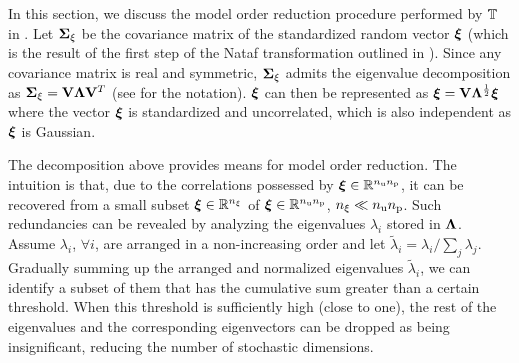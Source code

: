 In this section, we discuss the model order reduction procedure performed by $\transformation$ in .
Let $\bm{\Sigma}_\xi$ be the covariance matrix of the standardized random vector $\bm{\xi}$ (which is the result of the first step of the Nataf transformation outlined in ).
Since any covariance matrix is real and symmetric, $\bm{\Sigma}_\xi$ admits the eigenvalue decomposition as $\bm{\Sigma}_\xi = \mathbf{V} \mathbf{\Lambda} \mathbf{V}^T$ (see  for the notation).
$\bm{\xi}$ can then be represented as $\bm{\xi} = \mathbf{V} \mathbf{\Lambda}^\frac{1}{2} \bm{\xi}$ where the vector $\bm{\xi}$ is standardized and uncorrelated, which is also independent as $\bm{\xi}$ is Gaussian.

The decomposition above provides means for model order reduction.
The intuition is that, due to the correlations possessed by $\bm{\xi} \in \mathbb{R}^{{n_\text{u}} {n_\text{p}}}$, it can be recovered from a small subset $\bm{\xi} \in \mathbb{R}^{n_\xi}$ of $\bm{\xi}\in \mathbb{R}^{{n_\text{u}} {n_\text{p}}}$, ${n_\xi} \ll {n_\text{u}} {n_\text{p}}$.
Such redundancies can be revealed by analyzing the eigenvalues $\lambda_i$ stored in $\mathbf{\Lambda}$.
Assume $\lambda_i$, $\forall i$, are arranged in a non-increasing order and let $\tilde{\lambda}_i = \lambda_i / \sum_j \lambda_j$.
Gradually summing up the arranged and normalized eigenvalues $\tilde{\lambda}_i$, we can identify a subset of them that has the cumulative sum greater than a certain threshold.
When this threshold is sufficiently high (close to one), the rest of the eigenvalues and the corresponding eigenvectors can be dropped as being insignificant, reducing the number of stochastic dimensions.
